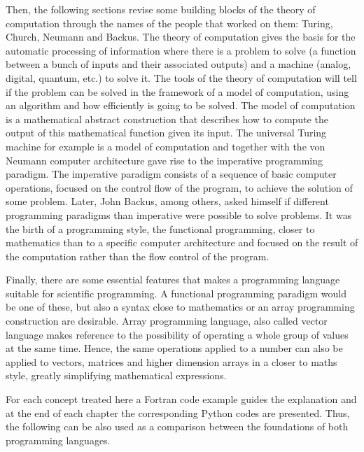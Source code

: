 Then, the following sections revise some building blocks of the theory of computation 
through the names of the people that worked on them: Turing, Church, Neumann and Backus. 
The theory of computation gives the basis for the automatic processing of information where there is a 
problem to solve (a function between a bunch of inputs and their associated outputs) 
and a machine (analog, digital, quantum, etc.) to solve it. 
The tools of the theory of computation will tell if the problem can be solved in the framework of a model of computation, 
using an algorithm and 
how efficiently is going to be solved. 
The model of computation is a mathematical abstract construction 
that describes how to compute the output of this mathematical function given its input.
The universal Turing machine for example is a model of computation and 
together with the von Neumann computer architecture gave rise 
to the imperative programming paradigm. 
The imperative paradigm consists of a sequence of basic computer operations, focused on the control flow of the program,
 to achieve the solution of some problem. 
Later, John Backus, among others, asked himself if different programming paradigms 
than imperative were possible to solve problems. 
It was the birth of a programming style, the functional programming, closer to mathematics than to a specific computer 
architecture and focused on the result of the computation rather than the flow control of the program. 

Finally, there are some essential features that makes a programming language suitable for scientific programming.
A functional programming paradigm would be one of these, but also a syntax close to mathematics 
or an array programming construction are desirable. 
Array programming language, also called vector language makes reference to the possibility 
of operating a whole group of values at the same time.
Hence, the same operations applied to a number can also be applied to vectors, matrices and higher dimension arrays
in a closer to maths style, greatly simplifying mathematical expressions.

For each concept treated here a Fortran code example guides the explanation and at the 
end of each chapter the corresponding Python codes are presented. Thus, the following
can be also used as a comparison between the foundations of both programming languages. 
 
 
 
